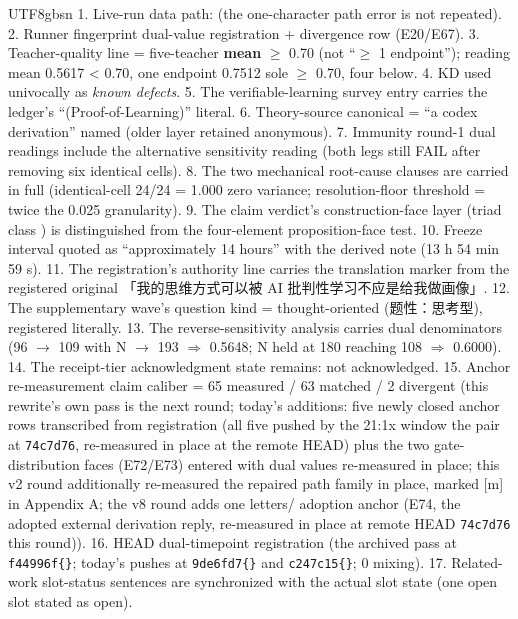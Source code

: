 \documentclass[11pt,letterpaper]{article}
\begin{document}
\begin{CJK}{UTF8}{gbsn}
1. Live-run data path:  (the one-character path error is not repeated). 2. Runner fingerprint dual-value registration + divergence row (E20/E67). 3. Teacher-quality line = five-teacher \textbf{mean} \ensuremath{\geq} 0.70 (not ``\ensuremath{\geq} 1 endpoint''); reading mean 0.5617 < 0.70, one endpoint 0.7512 sole \ensuremath{\geq} 0.70, four below. 4. KD used univocally as \emph{known defects}. 5. The verifiable-learning survey entry carries the ledger's ``(Proof-of-Learning)'' literal. 6. Theory-source canonical = ``a codex derivation'' named (older layer retained anonymous). 7. Immunity round-1 dual readings include the alternative sensitivity reading (both legs still FAIL after removing six identical cells). 8. The two mechanical root-cause clauses are carried in full (identical-cell 24/24 = 1.000 zero variance; resolution-floor threshold = twice the 0.025 granularity). 9. The claim verdict's construction-face layer (triad class ) is distinguished from the four-element proposition-face test. 10. Freeze interval quoted as ``approximately 14 hours'' with the derived note (13 h 54 min 59 s). 11. The registration's authority line carries the translation marker from the registered original 「我的思维方式可以被 AI 批判性学习\textellipsis{}\textellipsis{}不应是给我做画像」. 12. The supplementary wave's question kind = thought-oriented (题性：思考型), registered literally. 13. The reverse-sensitivity analysis carries dual denominators (96 \ensuremath{\to} 109 with N \ensuremath{\to} 193 \ensuremath{\Rightarrow} 0.5648; N held at 180 reaching 108 \ensuremath{\Rightarrow} 0.6000). 14. The receipt-tier acknowledgment state remains: not acknowledged. 15. Anchor re-measurement claim caliber = 65 measured / 63 matched / 2 divergent (this rewrite's own pass is the next round; today's additions: five newly closed anchor rows transcribed from registration (all five pushed by the 21:1x window \textemdash{} the pair at \texttt{74c7d76}, re-measured in place at the remote HEAD) plus the two gate-distribution faces (E72/E73) entered with dual values re-measured in place; this v2 round additionally re-measured the repaired path family in place, marked [m] in Appendix A; the v8 round adds one letters/ adoption anchor (E74, the adopted external derivation reply, re-measured in place at remote HEAD \texttt{74c7d76} this round)). 16. HEAD dual-timepoint registration (the archived pass at \texttt{f44996f\textellipsis\{\}}; today's pushes at \texttt{9de6fd7\textellipsis\{\}} and \texttt{c247c15\textellipsis\{\}}; 0 mixing). 17. Related-work slot-status sentences are synchronized with the actual slot state (one open slot stated as open).


\end{CJK}
\end{document}
